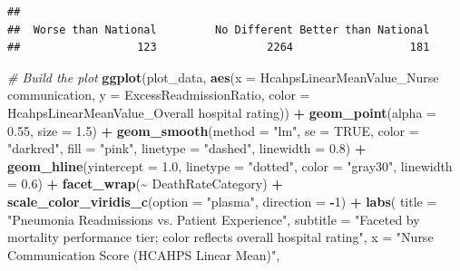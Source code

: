 \documentclass[
]{article}
\newenvironment{Shaded}{\begin{snugshade}}{\end{snugshade}}
\newcommand{\AttributeTok}[1]{\textcolor[rgb]{0.13,0.29,0.53}{#1}}
\newcommand{\CommentTok}[1]{\textcolor[rgb]{0.56,0.35,0.01}{\textit{#1}}}
\newcommand{\ConstantTok}[1]{\textcolor[rgb]{0.56,0.35,0.01}{#1}}
\newcommand{\DecValTok}[1]{\textcolor[rgb]{0.00,0.00,0.81}{#1}}
\newcommand{\FloatTok}[1]{\textcolor[rgb]{0.00,0.00,0.81}{#1}}
\newcommand{\FunctionTok}[1]{\textcolor[rgb]{0.13,0.29,0.53}{\textbf{#1}}}
\newcommand{\NormalTok}[1]{#1}
\newcommand{\SpecialCharTok}[1]{\textcolor[rgb]{0.81,0.36,0.00}{\textbf{#1}}}
\newcommand{\StringTok}[1]{\textcolor[rgb]{0.31,0.60,0.02}{#1}}
\begin{document}
\begin{verbatim}
## 
##  Worse than National         No Different Better than National 
##                  123                 2264                  181
\end{verbatim}

\begin{Shaded}
\begin{Highlighting}[]
\CommentTok{\# Build the plot}
\FunctionTok{ggplot}\NormalTok{(plot\_data,}
       \FunctionTok{aes}\NormalTok{(}\AttributeTok{x =} \StringTok{\textasciigrave{}}\AttributeTok{HcahpsLinearMeanValue\_Nurse communication}\StringTok{\textasciigrave{}}\NormalTok{,}
           \AttributeTok{y =}\NormalTok{ ExcessReadmissionRatio,}
           \AttributeTok{color =} \StringTok{\textasciigrave{}}\AttributeTok{HcahpsLinearMeanValue\_Overall hospital rating}\StringTok{\textasciigrave{}}\NormalTok{)) }\SpecialCharTok{+}
    \FunctionTok{geom\_point}\NormalTok{(}\AttributeTok{alpha =} \FloatTok{0.55}\NormalTok{, }\AttributeTok{size =} \FloatTok{1.5}\NormalTok{) }\SpecialCharTok{+}
    \FunctionTok{geom\_smooth}\NormalTok{(}\AttributeTok{method =} \StringTok{"lm"}\NormalTok{,}
                \AttributeTok{se =} \ConstantTok{TRUE}\NormalTok{,}
                \AttributeTok{color =} \StringTok{"darkred"}\NormalTok{,}
                \AttributeTok{fill =} \StringTok{"pink"}\NormalTok{,}
                \AttributeTok{linetype =} \StringTok{"dashed"}\NormalTok{,}
                \AttributeTok{linewidth =} \FloatTok{0.8}\NormalTok{) }\SpecialCharTok{+}
    \FunctionTok{geom\_hline}\NormalTok{(}\AttributeTok{yintercept =} \FloatTok{1.0}\NormalTok{,}
               \AttributeTok{linetype =} \StringTok{"dotted"}\NormalTok{,}
               \AttributeTok{color =} \StringTok{"gray30"}\NormalTok{,}
               \AttributeTok{linewidth =} \FloatTok{0.6}\NormalTok{) }\SpecialCharTok{+}
    \FunctionTok{facet\_wrap}\NormalTok{(}\SpecialCharTok{\textasciitilde{}}\NormalTok{ DeathRateCategory) }\SpecialCharTok{+}
    \FunctionTok{scale\_color\_viridis\_c}\NormalTok{(}\AttributeTok{option =} \StringTok{"plasma"}\NormalTok{, }\AttributeTok{direction =} \SpecialCharTok{{-}}\DecValTok{1}\NormalTok{) }\SpecialCharTok{+}
    \FunctionTok{labs}\NormalTok{(}
        \AttributeTok{title    =} \StringTok{"Pneumonia Readmissions vs. Patient Experience"}\NormalTok{,}
        \AttributeTok{subtitle =} \StringTok{"Faceted by mortality performance tier; color reflects overall hospital rating"}\NormalTok{,}
        \AttributeTok{x        =} \StringTok{"Nurse Communication Score (HCAHPS Linear Mean)"}\NormalTok{,}

\end{Highlighting}
\end{Shaded}
\end{document}

